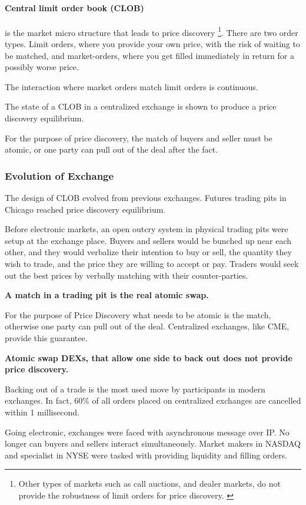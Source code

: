\documentclass[12pt]{article}
\begin{document}
\paragraph*{Central limit order book (CLOB)}is the market micro structure that leads to price discovery \footnote{Other types of markets such as call auctions, and dealer markets, do not provide the robustness of limit orders for price discovery. \cite{RePEc:hal:journl:hal-00459785}}. There are two order types. Limit orders, where you provide your own price, with the risk of waiting to be matched, and market-orders, where you get filled immediately in return for a possibly worse price.

The interaction where market orders match limit orders is continuous. 

The state of a CLOB in a centralized exchange is shown to produce a price discovery equilibrium. 

For the purpose of price discovery, the match of buyers and seller must be atomic, or one party can pull out of the deal after the fact. 

\subsubsection*{Evolution of Exchange}
The design of CLOB evolved from previous exchanges. Futures trading pits in Chicago reached price discovery equilibrium.  

Before electronic markets, an open outcry system in physical trading pits were setup at the exchange place. Buyers and sellers would be bunched up near each other, and they would verbalize their intention to buy or sell, the quantity they wish to trade, and the price they are willing to accept or pay. Traders would seek out the best prices by verbally matching with their counter-parties. 

\textbf{A match in a trading pit is the real atomic swap.} 

For the purpose of Price Discovery what needs to be atomic is the match, otherwise one party can pull out of the deal. Centralized exchanges, like CME, provide this guarantee. 

\textbf{Atomic swap DEXs, that allow one side to back out does not provide price discovery.}

Backing out of a trade is the most used move by participants in modern exchanges. In fact, 60\%  of all orders placed on centralized exchanges are cancelled within 1 millisecond.  

Going electronic, exchanges were faced with asynchronous message over IP. No longer can buyers and sellers interact simultaneously. Market makers in NASDAQ and specialist in NYSE were tasked with providing liquidity and filling orders. 
\end{document}
